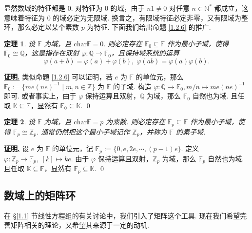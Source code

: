 \documentclass[10pt,openany]{article}
\theoremstyle{thmstyle} %
\newtheorem{theorem}{定理}[subsection]
\theoremstyle{defstyle} %
\theoremstyle{prostyle} %
\renewenvironment{proof}[1][证明]{\par\underline{\textbf{#1.}} \;\fangsong}{\qed\par}
\begin{document}
显然数域的特征都是 0. 对特征为 0 的域，由于 \( n 1 \neq 0 \) 对任意 \( n \in \mathbb{N}^* \) 都成立，这意味着特征为 0 的域必定为无限域. 换言之，有限域特征必定非零，又有限域为整环，那么必定以某个素数 \( p \) 为特征. 下面我们给出命题 \ref{1.2.6} 的推广.

\begin{theorem}
	设 \( \mathbb{F} \) 为域，且 \( \text{char} \mathbb{F}=0 \). 则必定存在 \( \mathbb{F}_0 \subseteq \mathbb{F} \) 作为最小子域，使得 \( \mathbb{F}_0 \cong \mathbb{Q} \)，这是指存在双射 \( \varphi: \mathbb{Q} \to \mathbb{F}_0 \)，且保持域系统的运算
	\[ \varphi(a+b)=\varphi(a)+\varphi(b), \; \varphi(ab)=\varphi(a)\varphi(b). \]
\end{theorem}

\begin{proof}
	类似命题 \ref{1.2.6} 可以证明，若 \( e \) 为 \( \mathbb{F} \) 的单位元，那么 \( \mathbb{F}_0:=\{me(ne)^{-1} \mid m,n \in \mathbb{Z} \} \) 为 \( \mathbb{F} \) 的子域. 构造 \( \varphi: \mathbb{Q} \to \mathbb{F}_0, m/n \mapsto me(ne)^{-1} \) 即可. 或者事实上，由于 \( \varphi \) 保持运算且双射，\( \mathbb{Q} \) 为域，那么 \( \mathbb{F}_0 \) 自然也为域. 且任取 \( \mathbb{K} \subseteq \mathbb{F} \)，显然有 \( \mathbb{F}_0 \subseteq \mathbb{K} \).
\end{proof}

\begin{theorem}
	设 \( \mathbb{F} \) 为域，且 \( \text{char} \mathbb{F}=p \) 为素数. 则必定存在 \( \mathbb{F}_p \subseteq \mathbb{F} \) 作为最小子域，使得 \( \mathbb{F}_p \cong \mathbb{Z}_p \). 通常仍然把这个最小子域记作 \( \mathbb{Z}_p \)，并称为 \( \mathbb{F} \) 的素子域.
\end{theorem}

\begin{proof}
	设 \( e \) 为 \( \mathbb{F} \) 的单位元，记 \( \mathbb{F}_p:=\{0,e,2e,\cdots,(p-1)e\} \). 定义 \( \varphi:\mathbb{Z}_p \to \mathbb{F}_p, \; [k] \mapsto ke \). 由于 \( \varphi \) 保持运算且双射，\( \mathbb{Z}_p \) 为域，那么 \( \mathbb{F}_p \) 自然也为域. 且任取 \( \mathbb{K} \subseteq \mathbb{F} \)，显然有 \( \mathbb{F}_p \subseteq \mathbb{K} \).
\end{proof}

\subsection{数域上的矩阵环}

在 \S \ref{1.1} 节线性方程组的有关讨论中，我们引入了矩阵这个工具. 现在我们希望完善矩阵相关的理论，又希望其来源于一定的动机. 
\end{document}
